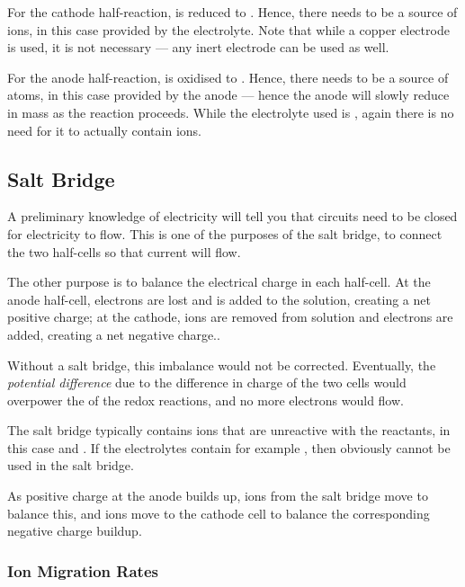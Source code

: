 			For the cathode half-reaction,  is reduced to . Hence, there needs to be a source of  ions,
			in this case provided by the  electrolyte. Note that while a copper electrode is used, it is not necessary --- any
			inert electrode can be used as well.

			For the anode half-reaction,  is oxidised to . Hence, there needs to be a source of  atoms,
			in this case provided by the anode --- hence the anode will slowly reduce in mass as the reaction proceeds. While the electrolyte
			used is , again there is no need for it to actually contain  ions.



		\subsection{Salt Bridge}

			A preliminary knowledge of electricity will tell you that circuits need to be closed for electricity to flow. This is one of the
			purposes of the salt bridge, to connect the two half-cells so that current will flow.

			The other purpose is to balance the electrical charge in each half-cell. At the anode half-cell, electrons are lost and
			 is added to the solution, creating a net positive charge; at the cathode,  ions are removed from solution
			and electrons are added, creating a net negative charge..

			Without a salt bridge, this imbalance would not be corrected. Eventually, the \textit{potential difference} due to the difference in
			charge of the two cells would overpower the \Ecell{} of the redox reactions, and no more electrons would flow.

			The salt bridge typically contains ions that are unreactive with the reactants, in this case  and \ch{\Cl-}. If the
			electrolytes contain for example , then obviously \ch{\Cl-} cannot be used in the salt bridge.

			As positive charge at the anode builds up, \ch{\Cl-} ions from the salt bridge move to balance this, and  ions move to the
			cathode cell to balance the corresponding negative charge buildup.


			\subsubsection{Ion Migration Rates}

